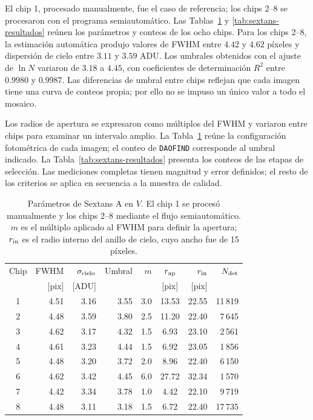 \documentclass[12pt,letterpaper,oneside]{book}
\begin{document}
El chip 1, procesado manualmente, fue el caso de referencia; los chips 2--8 se procesaron con el programa semiautomático. Las Tablas~\ref{tab:sextans-chips} y \ref{tab:sextans-resultados} reúnen los parámetros y conteos de los ocho chips. Para los chips 2--8, la estimación automática produjo valores de FWHM entre $4.42$ y $4.62$ píxeles y dispersión de cielo entre $3.11$ y $3.59$ ADU. Los umbrales obtenidos con el ajuste de $\ln N$ variaron de $3.18$ a $4.45$, con coeficientes de determinación $R^2$ entre $0.9980$ y $0.9987$. Las diferencias de umbral entre chips reflejan que cada imagen tiene una curva de conteos propia; por ello no se impuso un único valor a todo el mosaico.

Los radios de apertura se expresaron como múltiplos del FWHM y variaron entre chips para examinar un intervalo amplio. La Tabla~\ref{tab:sextans-chips} reúne la configuración fotométrica de cada imagen; el conteo de \texttt{DAOFIND} corresponde al umbral indicado. La Tabla~\ref{tab:sextans-resultados} presenta los conteos de las etapas de selección. Las mediciones completas tienen magnitud y error definidos; el resto de los criterios se aplica en secuencia a la muestra de calidad.

\begin{table}[H]
\centering
\small
\begin{tabular}{crrrrcrr}
\toprule
Chip & FWHM & $\sigma_{\rm cielo}$ & Umbral & $m$ & $r_{\rm ap}$ & $r_{\rm in}$ & $N_{\rm det}$ \\
 & [pix] & [ADU] & & & [pix] & [pix] & \\
\midrule
1 & 4.51 & 3.16 & 3.55 & 3.0 & 13.53 & 22.55 & 11\,819 \\
2 & 4.48 & 3.59 & 3.80 & 2.5 & 11.20 & 22.40 & 7\,645 \\
3 & 4.62 & 3.17 & 4.32 & 1.5 & 6.93 & 23.10 & 2\,561 \\
4 & 4.61 & 3.23 & 4.44 & 1.5 & 6.92 & 23.05 & 1\,856 \\
5 & 4.48 & 3.20 & 3.72 & 2.0 & 8.96 & 22.40 & 6\,150 \\
6 & 4.62 & 3.42 & 4.45 & 6.0 & 27.72 & 32.34 & 1\,570 \\
7 & 4.42 & 3.34 & 3.78 & 1.0 & 4.42 & 22.10 & 9\,719 \\
8 & 4.48 & 3.11 & 3.18 & 1.5 & 6.72 & 22.40 & 17\,735 \\
\bottomrule
\end{tabular}
\caption{Parámetros de Sextans A en $V$. El chip 1 se procesó manualmente y los chips 2--8 mediante el flujo semiautomático. $m$ es el múltiplo aplicado al FWHM para definir la apertura; $r_{\rm in}$ es el radio interno del anillo de cielo, cuyo ancho fue de 15 píxeles.}
\label{tab:sextans-chips}
\end{table}
\end{document}
